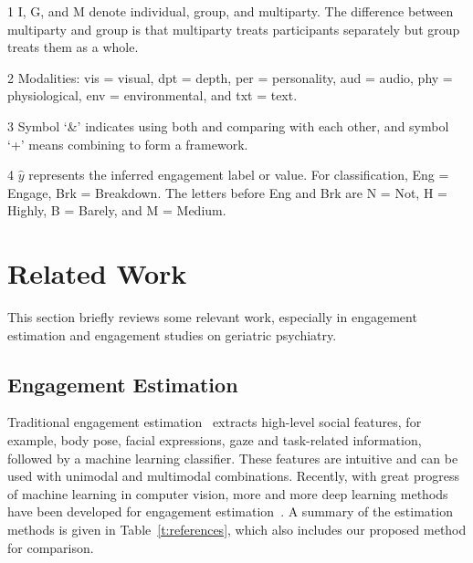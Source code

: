 \documentclass[VANCOUVER,STIX1COL]{WileyNJD-v2}
\begin{document}
\begin{table}[htb!]
\begin{threeparttable}[b]
\begin{tablenotes}
    \item [1] I, G, and M denote individual, group, and multiparty. The difference between multiparty and group is that multiparty treats participants separately but group treats them as a whole.
    \item [2] Modalities: vis = visual, dpt = depth, per = personality, aud = audio, phy = physiological, env = environmental, and txt = text.
    \item [3] Symbol `\&' indicates using both and comparing with each other, and symbol `+' means combining to form a framework.
    \item [4] $\hat{y}$ represents the inferred engagement label or value. For classification, Eng = Engage, Brk = Breakdown. The letters before Eng and Brk are N = Not, H = Highly, B = Barely, and M = Medium.
  \end{tablenotes}
 \end{threeparttable}
\end{table}

\section{Related Work}
\label{s:Related_Work}
This section briefly reviews some relevant work, especially in engagement estimation and engagement studies on geriatric psychiatry.

\subsection{Engagement Estimation}
\label{subs:Automated_Engagement_Estimation}

Traditional engagement estimation~\cite{Salam2017Fully,Celiktutan2019Multimodal,BenYoussef2019Early,Monkaresi2017Automated,Gao2020NGage} extracts high-level social features, for example, body pose, facial expressions, gaze and task-related information, followed by a machine learning classifier. These features are intuitive and can be used with unimodal and multimodal combinations. Recently, with great progress of machine learning in computer vision, more and more deep learning methods have been developed for engagement estimation~\cite{Saleh2021Improving,DelDuchetto2020Are,Zhu2020Multirate,Guhan2020ABCNet,Rudovic2019Personalized,Sumer2021Multimodal, Anagnostopoulou2021Engagement}. A summary of the estimation methods is given in Table~\ref{t:references}, which also includes our proposed method for comparison.
\end{document}
